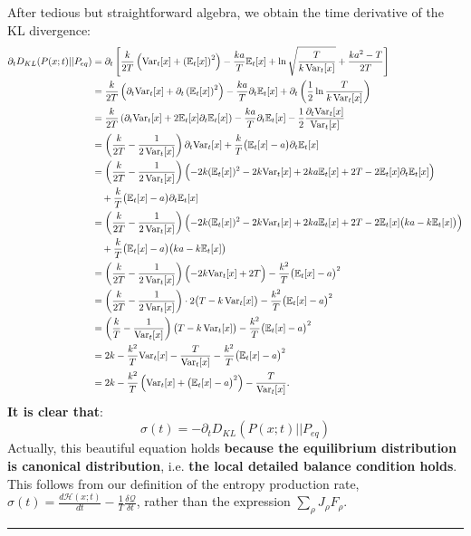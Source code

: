 \documentclass[11pt]{article}
\begin{document}
	After tedious but straightforward algebra, we obtain the time derivative of the KL divergence:
	\[
	\begin{aligned}
		\partial_tD_{KL}(P(x;t)||P_{eq})&=\partial_t\left[\frac{k}{2T}\left(\mathrm{Var}_t[x]+\left(\mathbb{E}_t[x]\right)^2\right)-\frac{ka}{T}\mathbb{E}_t[x]+\ln\sqrt{\frac{T}{k\,\mathrm{Var}_t[x]}}+\frac{ka^2-T}{2T}\right]\\
		&=\frac{k}{2T}\left(\partial_t\mathrm{Var}_t[x]+\partial_t\left(\mathbb{E}_t[x]\right)^2\right)-\frac{ka}{T}\partial_t\mathbb{E}_t[x]+\partial_t\left(\frac12\ln\frac{T}{k\,\mathrm{Var}_t[x]}\right)\\
		&=\frac{k}{2T}\left(\partial_t\mathrm{Var}_t[x]+2\mathbb{E}_t[x]\partial_t\mathbb{E}_t[x]\right)-\frac{ka}{T}\partial_t\mathbb{E}_t[x]-\frac{1}{2}\frac{\partial_t\mathrm{Var}_t[x]}{\mathrm{Var}_t[x]}\\
		&=\left(\frac{k}{2T}-\frac{1}{2\,\mathrm{Var}_t[x]}\right)\partial_t\mathrm{Var}_t[x]+\frac{k}{T}\bigl(\mathbb{E}_t[x]-a\bigr)\partial_t\mathbb{E}_t[x]\\
		&=\left(\frac{k}{2T}-\frac{1}{2\,\mathrm{Var}_t[x]}\right)\Bigl(-2k(\mathbb{E}_t[x])^2-2k\mathrm{Var}_t[x]+2ka\mathbb{E}_t[x]+2T-2\mathbb{E}_t[x]\partial_t\mathbb{E}_t[x]\Bigr)\\
		&\quad+\frac{k}{T}\bigl(\mathbb{E}_t[x]-a\bigr)\partial_t\mathbb{E}_t[x]\\
		&=\left(\frac{k}{2T}-\frac{1}{2\,\mathrm{Var}_t[x]}\right)\Bigl(-2k(\mathbb{E}_t[x])^2-2k\mathrm{Var}_t[x]+2ka\mathbb{E}_t[x]+2T-2\mathbb{E}_t[x]\bigl(k a-k\mathbb{E}_t[x]\bigr)\Bigr)\\
		&\quad+\frac{k}{T}\bigl(\mathbb{E}_t[x]-a\bigr)\bigl(k a-k\mathbb{E}_t[x]\bigr)\\
		&=\left(\frac{k}{2T}-\frac{1}{2\,\mathrm{Var}_t[x]}\right)\Bigl(-2k\mathrm{Var}_t[x]+2T\Bigr)-\frac{k^2}{T}\bigl(\mathbb{E}_t[x]-a\bigr)^2\\
		&=\left(\frac{k}{2T}-\frac{1}{2\,\mathrm{Var}_t[x]}\right)\cdot 2\bigl(T-k\,\mathrm{Var}_t[x]\bigr)-\frac{k^2}{T}\bigl(\mathbb{E}_t[x]-a\bigr)^2\\
		&=\left(\frac{k}{T}-\frac{1}{\mathrm{Var}_t[x]}\right)\bigl(T-k\,\mathrm{Var}_t[x]\bigr)-\frac{k^2}{T}\bigl(\mathbb{E}_t[x]-a\bigr)^2\\
		&=2k-\frac{k^2}{T}\mathrm{Var}_t[x]-\frac{T}{\mathrm{Var}_t[x]}-\frac{k^2}{T}\bigl(\mathbb{E}_t[x]-a\bigr)^2\\
		&=2k-\frac{k^2}{T}\left(\mathrm{Var}_t[x]+\bigl(\mathbb{E}_t[x]-a\bigr)^2\right)-\frac{T}{\mathrm{Var}_t[x]}.
	\end{aligned}
	\]
	\textbf{It is clear that}:
	\[
	\boxed{
		\sigma(t)=-\partial_tD_{KL}(P(x;t)||P_{eq})
	}
	\]
	Actually, this beautiful equation holds \textbf{because the equilibrium distribution is canonical distribution}, i.e. \textbf{the local detailed balance condition holds}.  This follows from our definition of the entropy production rate, $	\sigma(t)=\frac{d\mathcal{H}(x;t)}{dt}-\frac{1}{T}\frac{\delta\mathcal{Q}}{\delta t}$, rather than the expression $\sum_\rho J_\rho F_\rho$.
		\bigskip\hrule\bigskip
\end{document}
